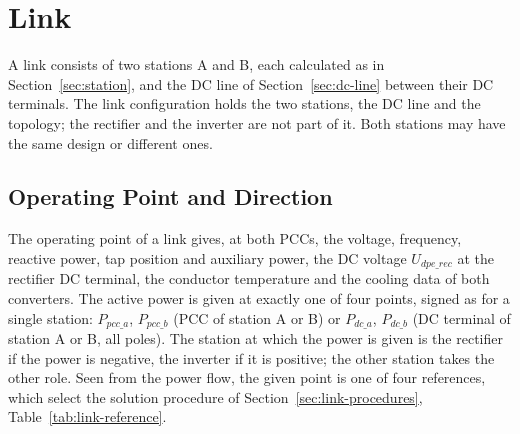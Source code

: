 \section{Link}
\label{sec:link}

A link consists of two stations A and B, each calculated as in Section~\ref{sec:station}, and the DC line of
Section~\ref{sec:dc-line} between their DC terminals. The link configuration holds the two stations, the DC line and
the topology; the rectifier and the inverter are not part of it. Both stations may have the same design or different
ones.

\subsection{Operating Point and Direction}
\label{sec:link-point}

The operating point of a link gives, at both PCCs, the voltage, frequency, reactive power, tap position and auxiliary
power, the DC voltage $U_{dpe\_rec}$ at the rectifier DC terminal, the conductor temperature and the cooling data of
both converters. The active power is given at exactly one of four points, signed as for a single station:
$P_{pcc\_a}$, $P_{pcc\_b}$ (PCC of station A or B) or $P_{dc\_a}$, $P_{dc\_b}$ (DC terminal of station A or B, all
poles). The station at which the power is given is the rectifier if the power is negative, the inverter if it is
positive; the other station takes the other role. Seen from the power flow, the given point is one of four
references, which select the solution procedure of Section~\ref{sec:link-procedures}, Table~\ref{tab:link-reference}.

